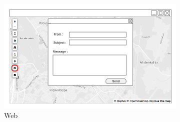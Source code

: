\begin{figure}[ht]
  \centering
  \begin{subfigure}[b]{0.6\textwidth}
    \includegraphics[width=\textwidth]
      {img/c02-application/png/web-basemap-contact.png}
    \caption{Web}
  \end{subfigure}
  ~
  \begin{subfigure}[b]{0.2\textwidth}

\end{subfigure}
\end{figure}
